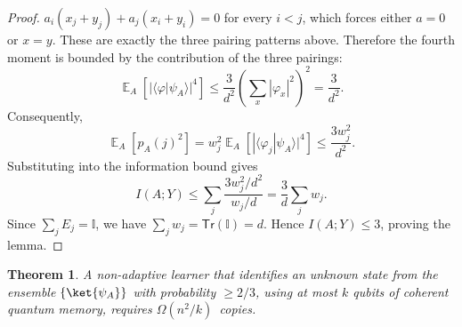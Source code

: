\documentclass[11pt]{article}
\newtheorem{theorem}{Theorem}[section]
\newcommand{\E}{\mathop{\mathbb{E}}}
\newcommand{\id}{\ensuremath{\mathbb{I}}}
\newcommand{\Tr}{\mathsf{Tr}}
\newcommand{\bk}[2]{\langle #1|#2\rangle}
\begin{document}
\begin{proof}
$a_i(x_j+y_j)+a_j(x_i+y_i)=0$ for every $i<j$, which forces either $a=0$ or
$x=y$.  These are exactly the three pairing patterns above. Therefore the fourth moment is bounded by the contribution of the three
pairings:
$$
    \E_A [|\bk{\varphi}{\psi_A}|^4]
    \le
    \frac{3}{d^2}
    \left(\sum_x|\varphi_x|^2\right)^2
    =
    \frac{3}{d^2}.
$$
Consequently,
$$
    \E_A[p_A(j)^2]
    =
    w_j^2\E_A[|\bk{\varphi_j}{\psi_A}|^4]
    \le
    \frac{3w_j^2}{d^2}.
$$
Substituting into the information bound gives
$$
    I(A;Y)
    \le
    \sum_j
    \frac{3w_j^2/d^2}{w_j/d}
    =
    \frac{3}{d}\sum_j w_j.
$$
Since $\sum_j E_j=\id$, we have $\sum_j w_j=\Tr(\id)=d$.  Hence
$I(A;Y)\le 3$, proving the lemma.
\end{proof}

\begin{theorem}
\label{thm:quadratic-phase-lower-bound}
A non-adaptive learner that identifies an unknown state from the ensemble $\{\ket{\psi_A}\}$ with probability $\geq 2/3$, using at most
$k$ qubits of coherent quantum memory, requires
$
    \Omega\!\left({n^2}/{k}\right)
$~copies.  
\end{theorem}
\end{document}
